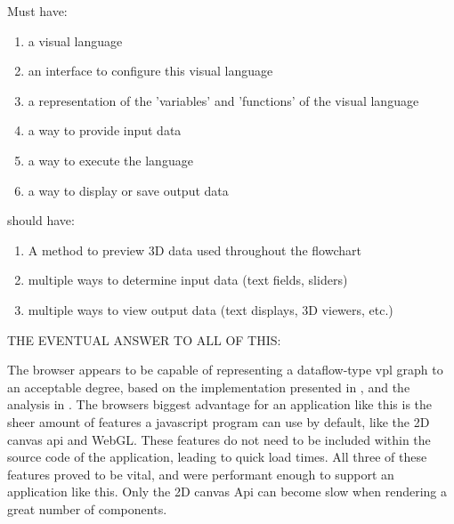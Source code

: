 




Must have: 
\begin{enumerate}[-]
  \item a visual language
  \item an interface to configure this visual language 
  \item a representation of the 'variables' and 'functions' of the visual language
  \item a way to provide input data 
  \item a way to execute the language
  \item a way to display or save output data
\end{enumerate}

should have:
\begin{enumerate}[-]
  \item A method to preview 3D data used throughout the flowchart
  \item multiple ways to determine input data (text fields, sliders) 
  \item multiple ways to view output data (text displays, 3D viewers, etc.)
\end{enumerate}



THE EVENTUAL ANSWER TO ALL OF THIS: 

The browser appears to be capable of representing a dataflow-type vpl graph to an acceptable degree, 
based on the implementation presented in , and the analysis in .
The browsers biggest advantage for an application like this is the sheer amount of features a javascript program can use by default, like the 2D canvas api and WebGL. 
These features do not need to be included within the source code of the application, leading to quick load times. 
All three of these features proved to be vital, and were performant enough to support an application like this. 
Only the 2D canvas Api can become slow when rendering a great number of components. 

